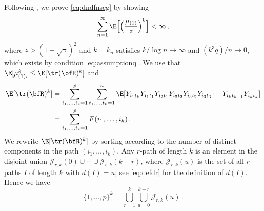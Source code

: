 Following \cite{geman}, we prove \eqref{eq:dndfnseg} by showing 
\begin{equation}\label{eq:showsumexp1}
\sum_{n=1}^\infty \E\Big[\Big(\frac{\mu_{(1)}}{z}\Big)^k  \Big] <\infty\,,
\end{equation}
where $z>(1+\sqrt{\gamma})^2$ and $k=k_n$ satisfies $k/\log n \to \infty$ and $(k^3 q)/n \to 0$, which exists by condition \eqref{eq:assumptionq}. 
We use that $\E[\mu_{(1)}^k] \le \E[\tr(\bfR)^k]$ and 
\begin{equation*}
\begin{split}
\E[\tr(\bfR)^k]&= \sum_{i_1,\ldots,i_k=1}^p \sum_{t_1,\ldots,t_k=1}^n \E[ Y_{i_1t_k} Y_{i_1t_1} Y_{i_2t_1}Y_{i_2t_2}Y_{i_3t_2} Y_{i_3t_3} \cdots Y_{i_kt_{k-1}} Y_{i_kt_k}  ]\\
&= \sum_{i_1,\ldots,i_k=1}^p F(i_1,\ldots,i_k)\, .
\end{split}
\end{equation*}
We rewrite $\E[\tr(\bfR)^k]$ by sorting according to the number of distinct components in the path $(i_1, \ldots, i_k)$. Any $r$-path of length $k$ is an element in the disjoint union $\mathcal{J}_{r,k}(0) \cup \cdots \cup \mathcal{J}_{r,k}(k-r)$, where $\mathcal{J}_{r,k}(u)$ is the set of all $r$-paths $I$ of length $k$ with $d(I)=u$; see \eqref{eq:defdr} for the definition of $d(I)$. Hence we have
\begin{equation}\label{eq:disjointkds}
\{1,\ldots, p\}^k = \bigcup_{r=1}^k \bigcup_{u=0}^{k-r} \mathcal{J}_{r,k}(u)\,.
\end{equation}

